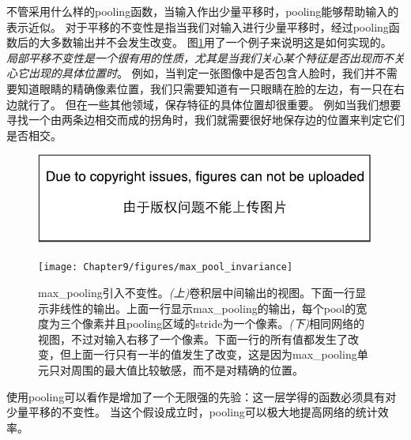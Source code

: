 不管采用什么样的\gls{pooling}函数，当输入作出少量平移时，\gls{pooling}能够帮助输入的表示近似。
对于平移的不变性是指当我们对输入进行少量平移时，经过\gls{pooling}函数后的大多数输出并不会发生改变。
图\ref{fig:chap9_max_pool_invariance}用了一个例子来说明这是如何实现的。
\emph{局部平移不变性是一个很有用的性质，尤其是当我们关心某个特征是否出现而不关心它出现的具体位置时}。
例如，当判定一张图像中是否包含人脸时，我们并不需要知道眼睛的精确像素位置，我们只需要知道有一只眼睛在脸的左边，有一只在右边就行了。
但在一些其他领域，保存特征的具体位置却很重要。
例如当我们想要寻找一个由两条边相交而成的拐角时，我们就需要很好地保存边的位置来判定它们是否相交。
\begin{figure}[!htb]
\ifOpenSource
\centerline{\includegraphics{figure.pdf}}
\else
\centerline{\texttt{[image: Chapter9/figures/max\_pool\_invariance]}}
\fi
\caption{\gls{max_pooling}引入不变性。\emph{(上)}卷积层中间输出的视图。下面一行显示非线性的输出。上面一行显示\gls{max_pooling}的输出，每个\gls{pool}的宽度为三个像素并且\gls{pooling}区域的\gls{stride}为一个像素。\emph{(下)}相同网络的视图，不过对输入右移了一个像素。下面一行的所有值都发生了改变，但上面一行只有一半的值发生了改变，这是因为\gls{max_pooling}单元只对周围的最大值比较敏感，而不是对精确的位置。}
\label{fig:chap9_max_pool_invariance}
\end{figure}

 
使用\gls{pooling}可以看作是增加了一个无限强的先验：这一层学得的函数必须具有对少量平移的不变性。
当这个假设成立时，\gls{pooling}可以极大地提高网络的统计效率。

